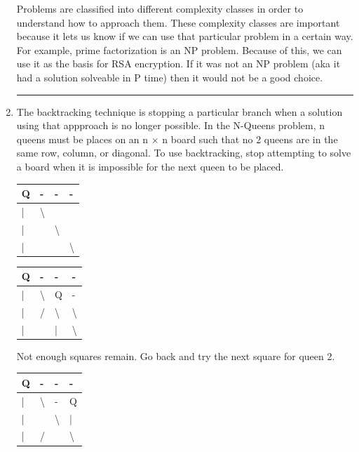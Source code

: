 \documentclass{article}
\begin{document}
\begin{enumerate}
    Problems are classified into different complexity classes in order to understand how to approach them. These complexity classes are important because it lets us know if we can use that particular problem in a certain way. For example, prime factorization is an NP problem. Because of this, we can use it as the basis for RSA encryption. If it was not an NP problem (aka it had a solution solveable in P time) then it would not be a good choice. 

\noindent\rule{8cm}{0.4pt}


\item 

    The backtracking technique is stopping a particular branch when a solution using that appproach is no longer possible. In the N-Queens problem, n queens must be places on an n $\times$ n board such that no 2 queens are in the same row, column, or diagonal. To use backtracking, stop attempting to solve a board when it is impossible for the next queen to be placed. 

    \begin{table}[H]
        \begin{tabular}{|l|l|l|l|}
        \hline
        Q & - & - & - \\ \hline
        | & \textbackslash{} &  &  \\ \hline
        | &  & \textbackslash{} &  \\ \hline
        | &  &  & \textbackslash{} \\ \hline
        \end{tabular}
    \end{table}

\begin{table}[H]
\begin{tabular}{|l|l|l|l|}
\hline
Q & - & - & - \\ \hline
| & \textbackslash{} & Q & - \\ \hline
| & / & \textbackslash{} & \textbackslash{} \\ \hline
| &  & | & \textbackslash{} \\ \hline
\end{tabular}
\end{table}


Not enough squares remain. Go back and try the next square for queen 2. 

\begin{table}[H]
\begin{tabular}{|l|l|l|l|}
\hline
Q & - & - & - \\ \hline
| & \textbackslash{} & - & Q \\ \hline
| &  & \textbackslash{} & | \\ \hline
| & / &  & \textbackslash{} \\ \hline
\end{tabular}
\end{table}



\end{enumerate}
\end{document}

